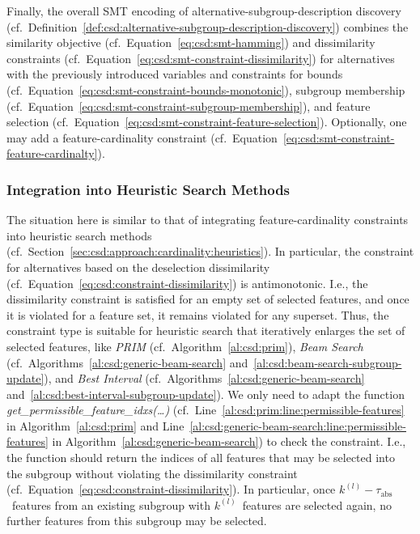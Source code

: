 \documentclass{article}
\theoremstyle{definition}
\begin{document}
Finally, the overall SMT encoding of alternative-subgroup-description discovery (cf.~Definition~\ref{def:csd:alternative-subgroup-description-discovery}) combines the similarity objective (cf.~Equation~\ref{eq:csd:smt-hamming}) and dissimilarity constraints (cf.~Equation~\ref{eq:csd:smt-constraint-dissimilarity}) for alternatives with the previously introduced variables and constraints for bounds (cf.~Equation~\ref{eq:csd:smt-constraint-bounds-monotonic}), subgroup membership (cf.~Equation~\ref{eq:csd:smt-constraint-subgroup-membership}), and feature selection (cf.~Equation~\ref{eq:csd:smt-constraint-feature-selection}).
Optionally, one may add a feature-cardinality constraint (cf.~Equation~\ref{eq:csd:smt-constraint-feature-cardinalty}).

\subsubsection{Integration into Heuristic Search Methods}
\label{sec:csd:approach:alternatives:heuristics}

The situation here is similar to that of integrating feature-cardinality constraints into heuristic search methods (cf.~Section~\ref{sec:csd:approach:cardinality:heuristics}).
In particular, the constraint for alternatives based on the deselection dissimilarity (cf.~Equation~\ref{eq:csd:constraint-dissimilarity}) is antimonotonic.
I.e., the dissimilarity constraint is satisfied for an empty set of selected features, and once it is violated for a feature set, it remains violated for any superset.
Thus, the constraint type is suitable for heuristic search that iteratively enlarges the set of selected features, like \emph{PRIM} (cf.~Algorithm~\ref{al:csd:prim}), \emph{Beam Search} (cf.~Algorithms~\ref{al:csd:generic-beam-search} and~\ref{al:csd:beam-search-subgroup-update}), and \emph{Best Interval} (cf.~Algorithms~\ref{al:csd:generic-beam-search} and~\ref{al:csd:best-interval-subgroup-update}).
We only need to adapt the function \emph{get\_permissible\_feature\_idxs(\dots)} (cf.~Line~\ref{al:csd:prim:line:permissible-features} in Algorithm~\ref{al:csd:prim} and Line~\ref{al:csd:generic-beam-search:line:permissible-features} in Algorithm~\ref{al:csd:generic-beam-search}) to check the constraint.
I.e., the function should return the indices of all features that may be selected into the subgroup without violating the dissimilarity constraint (cf.~Equation~\ref{eq:csd:constraint-dissimilarity}).
In particular, once $k^{(l)} - \tau_{\text{abs}}$~features from an existing subgroup with $k^{(l)}$~features are selected again, no further features from this subgroup may be selected.
\end{document}
